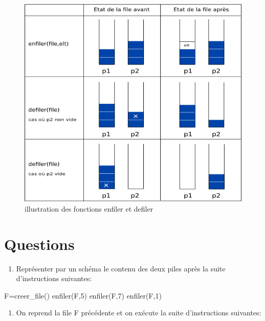 \documentclass[11pt]{article}
\providecommand{\tightlist}{%
      \setlength{\itemsep}{0pt}\setlength{\parskip}{0pt}}
\newenvironment{Shaded}{}{}
\newcommand{\DecValTok}[1]{\textcolor[rgb]{0.25,0.63,0.44}{{#1}}}
\newcommand{\NormalTok}[1]{{#1}}
\newcommand{\OperatorTok}[1]{\textcolor[rgb]{0.40,0.40,0.40}{{#1}}}
\begin{document}
\begin{figure}
\centering
\includegraphics[scale=0.8]{img/fig1.png}
\caption{illustration des fonctions enfiler et defiler}
\end{figure}

    \hypertarget{questions}{%
\section*{Questions}\label{questions}}

\begin{enumerate}
\def\labelenumi{\arabic{enumi}.}
\tightlist
\item
  Représenter par un schéma le contenu des deux piles après la suite
  d'instructions suivantes:
\end{enumerate}

\begin{Shaded}
\begin{Highlighting}[]
\NormalTok{F}\OperatorTok{=}\NormalTok{creer\_file()}
\NormalTok{enfiler(F,}\DecValTok{5}\NormalTok{)}
\NormalTok{enfiler(F,}\DecValTok{7}\NormalTok{)}
\NormalTok{enfiler(F,}\DecValTok{1}\NormalTok{)}
\end{Highlighting}
\end{Shaded}

\begin{enumerate}
\def\labelenumi{\arabic{enumi}.}
\setcounter{enumi}{1}
\tightlist
\item
  On reprend la file F précédente et on exécute la suite d'instructions
  suivantes:
\end{enumerate}
\end{document}
